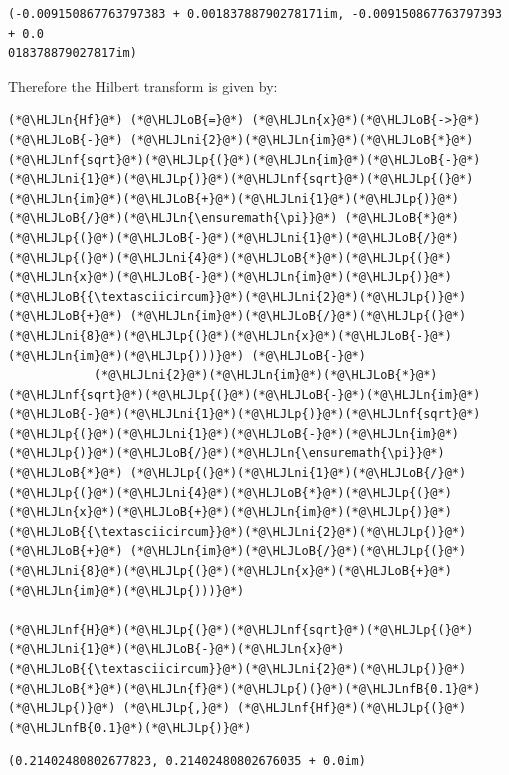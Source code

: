 \documentclass[12pt,a4paper]{article}
\newcommand{\HLJLn}[1]{#1}
\newcommand{\HLJLnf}[1]{\textcolor[RGB]{66,102,213}{#1}}
\newcommand{\HLJLnfB}[1]{\textcolor[RGB]{59,151,46}{#1}}
\newcommand{\HLJLni}[1]{\textcolor[RGB]{59,151,46}{#1}}
\newcommand{\HLJLoB}[1]{\textcolor[RGB]{102,102,102}{\textbf{#1}}}
\newcommand{\HLJLp}[1]{#1}
\begin{document}
\begin{lstlisting}
(-0.009150867763797383 + 0.00183788790278171im, -0.009150867763797393 + 0.0
018378879027817im)
\end{lstlisting}


Therefore the Hilbert transform is given by:


\begin{lstlisting}
(*@\HLJLn{Hf}@*) (*@\HLJLoB{=}@*) (*@\HLJLn{x}@*)(*@\HLJLoB{->}@*) (*@\HLJLoB{-}@*) (*@\HLJLni{2}@*)(*@\HLJLn{im}@*)(*@\HLJLoB{*}@*)(*@\HLJLnf{sqrt}@*)(*@\HLJLp{(}@*)(*@\HLJLn{im}@*)(*@\HLJLoB{-}@*)(*@\HLJLni{1}@*)(*@\HLJLp{)}@*)(*@\HLJLnf{sqrt}@*)(*@\HLJLp{(}@*)(*@\HLJLn{im}@*)(*@\HLJLoB{+}@*)(*@\HLJLni{1}@*)(*@\HLJLp{)}@*)(*@\HLJLoB{/}@*)(*@\HLJLn{\ensuremath{\pi}}@*) (*@\HLJLoB{*}@*) (*@\HLJLp{(}@*)(*@\HLJLoB{-}@*)(*@\HLJLni{1}@*)(*@\HLJLoB{/}@*)(*@\HLJLp{(}@*)(*@\HLJLni{4}@*)(*@\HLJLoB{*}@*)(*@\HLJLp{(}@*)(*@\HLJLn{x}@*)(*@\HLJLoB{-}@*)(*@\HLJLn{im}@*)(*@\HLJLp{)}@*)(*@\HLJLoB{{\textasciicircum}}@*)(*@\HLJLni{2}@*)(*@\HLJLp{)}@*) (*@\HLJLoB{+}@*) (*@\HLJLn{im}@*)(*@\HLJLoB{/}@*)(*@\HLJLp{(}@*)(*@\HLJLni{8}@*)(*@\HLJLp{(}@*)(*@\HLJLn{x}@*)(*@\HLJLoB{-}@*)(*@\HLJLn{im}@*)(*@\HLJLp{)))}@*) (*@\HLJLoB{-}@*) 
            (*@\HLJLni{2}@*)(*@\HLJLn{im}@*)(*@\HLJLoB{*}@*)(*@\HLJLnf{sqrt}@*)(*@\HLJLp{(}@*)(*@\HLJLoB{-}@*)(*@\HLJLn{im}@*)(*@\HLJLoB{-}@*)(*@\HLJLni{1}@*)(*@\HLJLp{)}@*)(*@\HLJLnf{sqrt}@*)(*@\HLJLp{(}@*)(*@\HLJLni{1}@*)(*@\HLJLoB{-}@*)(*@\HLJLn{im}@*)(*@\HLJLp{)}@*)(*@\HLJLoB{/}@*)(*@\HLJLn{\ensuremath{\pi}}@*) (*@\HLJLoB{*}@*) (*@\HLJLp{(}@*)(*@\HLJLni{1}@*)(*@\HLJLoB{/}@*)(*@\HLJLp{(}@*)(*@\HLJLni{4}@*)(*@\HLJLoB{*}@*)(*@\HLJLp{(}@*)(*@\HLJLn{x}@*)(*@\HLJLoB{+}@*)(*@\HLJLn{im}@*)(*@\HLJLp{)}@*)(*@\HLJLoB{{\textasciicircum}}@*)(*@\HLJLni{2}@*)(*@\HLJLp{)}@*) (*@\HLJLoB{+}@*) (*@\HLJLn{im}@*)(*@\HLJLoB{/}@*)(*@\HLJLp{(}@*)(*@\HLJLni{8}@*)(*@\HLJLp{(}@*)(*@\HLJLn{x}@*)(*@\HLJLoB{+}@*)(*@\HLJLn{im}@*)(*@\HLJLp{)))}@*)

(*@\HLJLnf{H}@*)(*@\HLJLp{(}@*)(*@\HLJLnf{sqrt}@*)(*@\HLJLp{(}@*)(*@\HLJLni{1}@*)(*@\HLJLoB{-}@*)(*@\HLJLn{x}@*)(*@\HLJLoB{{\textasciicircum}}@*)(*@\HLJLni{2}@*)(*@\HLJLp{)}@*)(*@\HLJLoB{*}@*)(*@\HLJLn{f}@*)(*@\HLJLp{)(}@*)(*@\HLJLnfB{0.1}@*)(*@\HLJLp{)}@*) (*@\HLJLp{,}@*) (*@\HLJLnf{Hf}@*)(*@\HLJLp{(}@*)(*@\HLJLnfB{0.1}@*)(*@\HLJLp{)}@*)
\end{lstlisting}

\begin{lstlisting}
(0.21402480802677823, 0.21402480802676035 + 0.0im)
\end{lstlisting}
\end{document}
